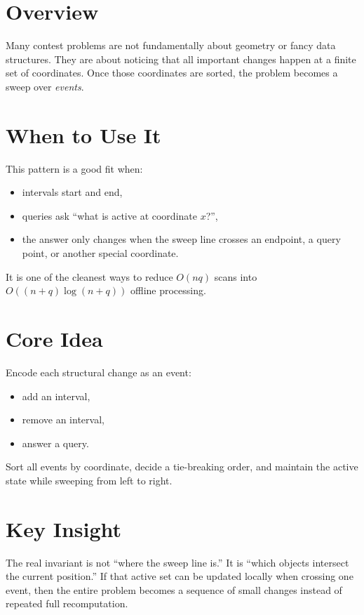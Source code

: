 \section*{Overview}

Many contest problems are not fundamentally about geometry or fancy data structures. They are about noticing that all
important changes happen at a finite set of coordinates. Once those coordinates are sorted, the problem becomes a sweep
over \emph{events}.

\section*{When to Use It}

This pattern is a good fit when:

\begin{itemize}
  \item intervals start and end,
  \item queries ask ``what is active at coordinate \(x\)?'',
  \item the answer only changes when the sweep line crosses an endpoint, a query point, or another special coordinate.
\end{itemize}

It is one of the cleanest ways to reduce \(O(nq)\) scans into \(O((n+q)\log(n+q))\) offline processing.

\section*{Core Idea}

Encode each structural change as an event:

\begin{itemize}
  \item add an interval,
  \item remove an interval,
  \item answer a query.
\end{itemize}

Sort all events by coordinate, decide a tie-breaking order, and maintain the active state while sweeping from left to
right.

\section*{Key Insight}

The real invariant is not ``where the sweep line is.'' It is ``which objects intersect the current position.'' If that
active set can be updated locally when crossing one event, then the entire problem becomes a sequence of small changes
instead of repeated full recomputation.

